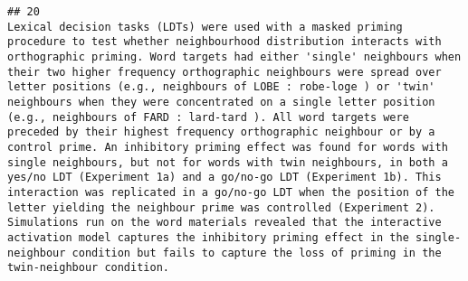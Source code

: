 \documentclass[
  english,
  man]{apa6}
\begin{document}
\begin{verbatim}
## 20                                                                                                                                                                                                                                                                                                                                                                                                                                                                                                                                                                                                                                                                                                                                                                                                                                                                                                                                                                                                                                                                                                                                                                                                                                                                                                                                                                                                                                                                                                                       Lexical decision tasks (LDTs) were used with a masked priming procedure to test whether neighbourhood distribution interacts with orthographic priming. Word targets had either 'single' neighbours when their two higher frequency orthographic neighbours were spread over letter positions (e.g., neighbours of LOBE : robe-loge ) or 'twin' neighbours when they were concentrated on a single letter position (e.g., neighbours of FARD : lard-tard ). All word targets were preceded by their highest frequency orthographic neighbour or by a control prime. An inhibitory priming effect was found for words with single neighbours, but not for words with twin neighbours, in both a yes/no LDT (Experiment 1a) and a go/no-go LDT (Experiment 1b). This interaction was replicated in a go/no-go LDT when the position of the letter yielding the neighbour prime was controlled (Experiment 2). Simulations run on the word materials revealed that the interactive activation model captures the inhibitory priming effect in the single-neighbour condition but fails to capture the loss of priming in the twin-neighbour condition.

\end{verbatim}
\end{document}
